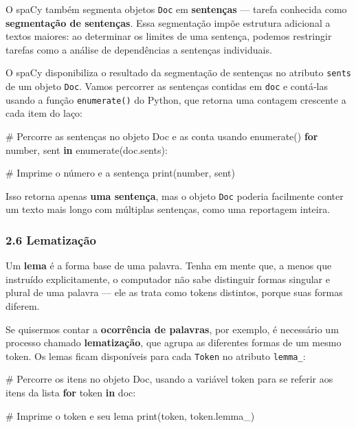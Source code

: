 \documentclass[
  brazilian,
  11pt,
]{article}
\newenvironment{Shaded}{\begin{snugshade}}{\end{snugshade}}
\newcommand{\BuiltInTok}[1]{\textcolor[rgb]{0.50,0.55,0.55}{#1}}
\newcommand{\CommentTok}[1]{\textcolor[rgb]{0.48,0.49,0.49}{#1}}
\newcommand{\ControlFlowTok}[1]{\textcolor[rgb]{0.99,0.74,0.29}{\textbf{#1}}}
\newcommand{\KeywordTok}[1]{\textcolor[rgb]{0.81,0.81,0.76}{\textbf{#1}}}
\newcommand{\NormalTok}[1]{\textcolor[rgb]{0.81,0.81,0.76}{#1}}
\let\oldtexttt\texttt
\renewcommand{\texttt}[1]{{\color{inlink}\oldtexttt{#1}}}
\begin{document}
O spaCy também segmenta objetos \texttt{Doc} em \textbf{sentenças} ---
tarefa conhecida como \textbf{segmentação de sentenças}. Essa
segmentação impõe estrutura adicional a textos maiores: ao determinar os
limites de uma sentença, podemos restringir tarefas como a análise de
dependências a sentenças individuais.

O spaCy disponibiliza o resultado da segmentação de sentenças no
atributo \texttt{sents} de um objeto \texttt{Doc}. Vamos percorrer as
sentenças contidas em \texttt{doc} e contá‑las usando a função
\texttt{enumerate()} do Python, que retorna uma contagem crescente a
cada item do laço:

\begin{Shaded}
\begin{Highlighting}[]
\CommentTok{\# Percorre as sentenças no objeto Doc e as conta usando enumerate()}
\ControlFlowTok{for}\NormalTok{ number, sent }\KeywordTok{in} \BuiltInTok{enumerate}\NormalTok{(doc.sents):}

    \CommentTok{\# Imprime o número e a sentença}
    \BuiltInTok{print}\NormalTok{(number, sent)}
\end{Highlighting}
\end{Shaded}

Isso retorna apenas \textbf{uma sentença}, mas o objeto \texttt{Doc}
poderia facilmente conter um texto mais longo com múltiplas sentenças,
como uma reportagem inteira.

\subsubsection{2.6 Lematização}\label{lematizauxe7uxe3o}

Um \textbf{lema} é a forma base de uma palavra. Tenha em mente que, a
menos que instruído explicitamente, o computador não sabe distinguir
formas singular e plural de uma palavra --- ele as trata como tokens
distintos, porque suas formas diferem.

Se quisermos contar a \textbf{ocorrência de palavras}, por exemplo, é
necessário um processo chamado \textbf{lematização}, que agrupa as
diferentes formas de um mesmo token. Os lemas ficam disponíveis para
cada \texttt{Token} no atributo \texttt{lemma\_}:

\begin{Shaded}
\begin{Highlighting}[]
\CommentTok{\# Percorre os itens no objeto Doc, usando a variável \textquotesingle{}token\textquotesingle{} para se referir aos itens da lista}
\ControlFlowTok{for}\NormalTok{ token }\KeywordTok{in}\NormalTok{ doc:}

    \CommentTok{\# Imprime o token e seu lema}
    \BuiltInTok{print}\NormalTok{(token, token.lemma\_)}
\end{Highlighting}
\end{Shaded}
\end{document}
